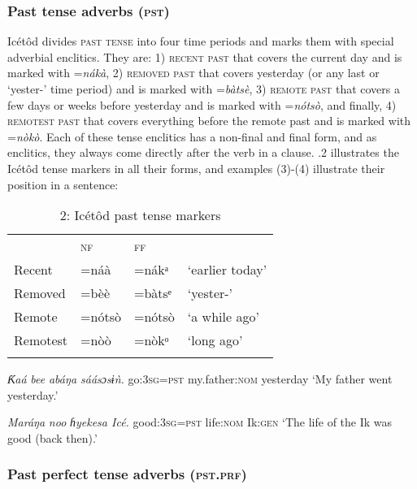 \begin{table}
\subsubsection{Past tense adverbs (\textsc{pst})}

Icétôd divides \textsc{past tense }into four time periods and marks them with special adverbial enclitics. They are: 1) \textsc{recent past} that covers the current day and is marked with =\textit{nákà}, 2) \textsc{removed past} that covers yesterday (or any last or ‘yester-’ time period) and is marked with =\textit{bàtsè}, 3) \textsc{remote past} that covers a few days or weeks before yesterday and is marked with =\textit{nótsò}, and finally, 4) \textsc{remotest past} that covers everything before the remote past and is marked with =\textit{nòkò}. Each of these tense enclitics has a non-final and final form, and as enclitics, they always come directly after the verb in a clause. .2 illustrates the Icétôd tense markers in all their forms, and examples (3)-(4) illustrate their position in a sentence:


\begin{table}
\caption{2: Icétôd past tense markers}
\label{tab:9}


\begin{tabularx}{\textwidth}{XXXX} & \textsc{nf} & \textsc{ff} & \\
\lsptoprule
Recent & =náà & =nákᵃ & ‘earlier today’\\
Removed & =bèè & =bàtsᵉ & ‘yester-’\\
Remote & =nótsò & =nótsò & ‘a while ago’\\
Remotest & =nòò & =nòkᵒ & ‘long ago’\\
\lspbottomrule
\end{tabularx}
\end{table}



\textit{Ƙ}\textit{aá }\textit{bee}\textit{   abáŋa     sáásɔsɨǹ.}
go:\textsc{3sg}=\textsc{pst}   my.father:\textsc{nom}   yesterday
‘My father went yesterday.’




\textit{Maráŋa }\textit{noo}\textit{   ɦyekesa   Icé.}
good:\textsc{3sg}=\textsc{pst}   life:\textsc{nom}   Ik:\textsc{gen}
‘The life of the Ik was good (back then).’




\subsubsection{Past perfect tense adverbs (\textsc{pst.prf})}


\end{table}
